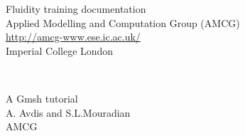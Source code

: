 \documentclass[11pt,a4paper,twoside,openany]{article}
\begin{document}
\baselineskip=18pt

\begin{titlepage}
\setlength{\hoffset}{0pt}
\setlength{\voffset}{0pt}
\setlength{\oddsidemargin}{-1in}
\setlength{\topmargin}{-1.5in}
\setlength{\textwidth}{\paperwidth}

\begin{minipage}[t]{2.5in}
\baselineskip=10pt
{\footnotesize
Fluidity training documentation\\
Applied Modelling and Computation Group (AMCG)\\
\url{http://amcg-www.ese.ic.ac.uk/}\\
Imperial College London}
\end{minipage}\\[40mm]

\begin{minipage}{\textwidth}
\begin{center}
\huge A Gmsh tutorial\\[10mm]
\normalsize A. Avdis and S.L.Mouradian\\
AMCG
\end{center}
\end{minipage}
\\[10mm]
\begin{minipage}{0.1\paperwidth}
\hfill
\end{minipage}
\begin{minipage}{0.8\paperwidth}
 \begin{center}
 \begin{minipage}[t]{3.2in}
 \end{minipage}\hfill
 \begin{minipage}[t]{3in}{\footnotesize{\tableofcontents}}\end{minipage}\\[10pt]
 \end{center}
\end{minipage}
%
\end{titlepage}
\end{document}
